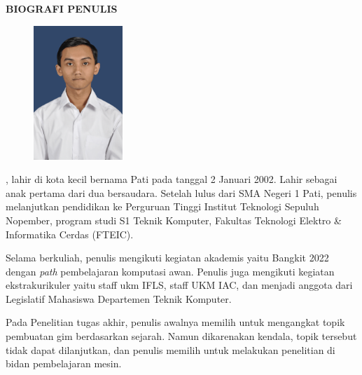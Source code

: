\begin{center}
  \Large
  \textbf{BIOGRAFI PENULIS}
\end{center}


\vspace{2ex}

\begin{figure}
  \centering
  \vspace{-3ex}
  \includegraphics[width=0.3\textwidth]{gambar/foto diri.png}
  \vspace{-4ex}
\end{figure}

\name{}, lahir di kota kecil bernama Pati pada tanggal 2 Januari 2002. Lahir sebagai anak pertama dari dua bersaudara. Setelah lulus dari SMA Negeri 1 Pati, penulis melanjutkan pendidikan ke Perguruan Tinggi Institut Teknologi Sepuluh Nopember, program studi S1 Teknik Komputer, Fakultas Teknologi Elektro \& Informatika Cerdas (FTEIC).

Selama berkuliah, penulis mengikuti kegiatan akademis yaitu Bangkit 2022 dengan \emph{path} pembelajaran komputasi awan. Penulis juga mengikuti kegiatan ekstrakurikuler yaitu staff ukm IFLS, staff UKM IAC, dan menjadi anggota dari Legislatif Mahasiswa Departemen Teknik Komputer.

Pada Penelitian tugas akhir, penulis awalnya memilih untuk mengangkat topik pembuatan gim berdasarkan sejarah. Namun dikarenakan kendala, topik tersebut tidak dapat dilanjutkan, dan penulis memilih untuk melakukan penelitian di bidan pembelajaran mesin.

%
%
